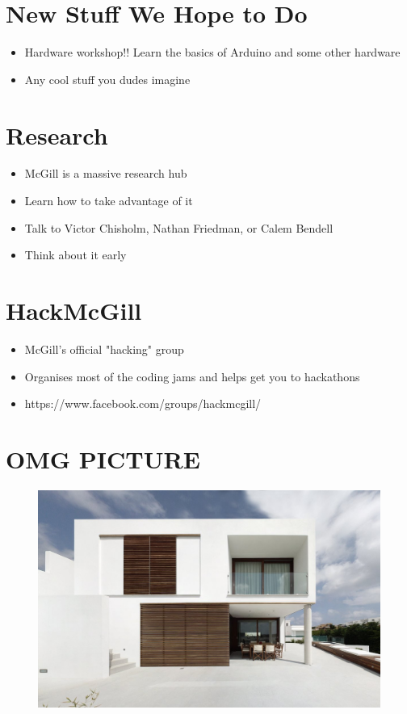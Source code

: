 \clearpage

\section{New Stuff We Hope to Do}

\begin{itemize}
	\item Hardware workshop!!  Learn the basics of Arduino and some other hardware
	\item Any cool stuff you dudes imagine
\end{itemize}

\clearpage

\section{Research}

	\begin{itemize}
		\item McGill is a massive research hub
		\item Learn how to take advantage of it
		\item Talk to Victor Chisholm, Nathan Friedman, or Calem Bendell
		\item Think about it early
	\end{itemize}
	
\clearpage

\section{HackMcGill}

	\begin{itemize}
		\item McGill's official "hacking" group
		\item Organises most of the coding jams and helps get you to hackathons
		\item https://www.facebook.com/groups/hackmcgill/
	\end{itemize}
	
\section{OMG PICTURE}

\begin{figure}[H]
	\centering
	\includegraphics[width=.7\textwidth]{gfx/modern-minimalist-square-house-menorca-sun-shades-for-the-windows-ideas.jpg}
\end{figure}

